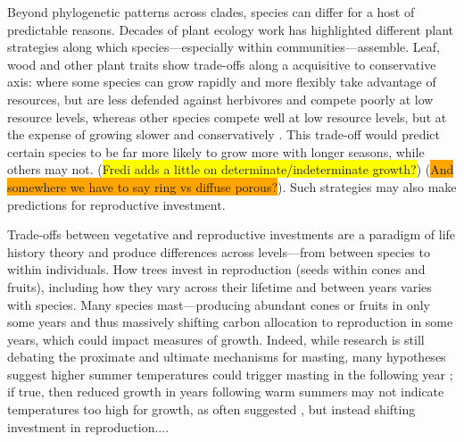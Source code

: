 \documentclass[11pt]{article}
\begin{document}
Beyond phylogenetic patterns across clades, species can differ for a host of predictable reasons. Decades of plant ecology work has highlighted different plant strategies along which species---especially within communities---assemble. Leaf, wood and other plant traits show trade-offs along a acquisitive to conservative axis: where some species can grow rapidly and more flexibly take advantage of resources, but are less defended against herbivores and compete poorly at low resource levels, whereas other species compete well at low resource levels, but at the expense of growing slower and conservatively \citep[][]{Grime:1977sw,diaz2016}. This trade-off would predict certain species to be far more likely to grow more with longer seasons, while others may not. (\colorbox{yellow}{Fredi adds a little on determinate/indeterminate growth?}) (\colorbox{orange}{And somewhere we have to say ring vs diffuse porous?}). Such strategies may also make predictions for reproductive investment. %

Trade-offs between vegetative and reproductive investments are a paradigm of life history theory and produce differences across levels---from between species to within individuals. How trees invest in reproduction (seeds within cones and fruits), including how they vary across their lifetime and between years varies with species. Many species mast---producing abundant cones or fruits in only some years and thus massively shifting carbon allocation to reproduction in some years, which could impact measures of growth. Indeed, while research is still debating the proximate and ultimate mechanisms for masting, many hypotheses suggest higher summer temperatures could trigger masting in the following year \citep{hacket2016tree,hacket2016consistent}; if true, then reduced growth in years following warm summers may not indicate temperatures too high for growth, as often suggested \citep[e.g.,][]{gantois2022new,dow2022warm}, but instead shifting investment in reproduction.... 
\end{document}
